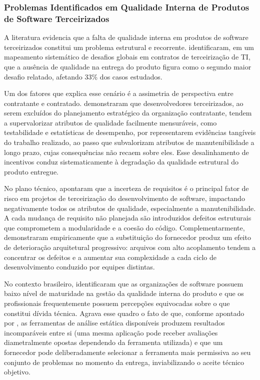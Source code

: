 \subsubsection{Problemas Identificados em Qualidade Interna de Produtos de Software Terceirizados}

A literatura evidencia que a falta de qualidade interna em produtos de software terceirizados constitui um problema estrutural e recorrente.  identificaram, em um mapeamento sistemático de desafios globais em contratos de terceirização de TI, que a ausência de qualidade na entrega do produto figura como o segundo maior desafio relatado, afetando 33\% dos casos estudados.

Um dos fatores que explica esse cenário é a assimetria de perspectiva entre contratante e contratado.  demonstraram que desenvolvedores terceirizados, ao serem excluídos do planejamento estratégico da organização contratante, tendem a supervalorizar atributos de qualidade facilmente mensuráveis, como testabilidade e estatísticas de desempenho, por representarem evidências tangíveis do trabalho realizado, ao passo que subvalorizam atributos de manutenibilidade a longo prazo, cujas consequências não recaem sobre eles. Esse desalinhamento de incentivos conduz sistematicamente à degradação da qualidade estrutural do produto entregue.

No plano técnico,  apontaram que a incerteza de requisitos é o principal fator de risco em projetos de terceirização do desenvolvimento de software, impactando negativamente todos os atributos de qualidade, especialmente a manutenibilidade. A cada mudança de requisito não planejada são introduzidos defeitos estruturais que comprometem a modularidade e a coesão do código. Complementarmente,  demonstraram empiricamente que a substituição do fornecedor produz um efeito de deterioração arquitetural progressivo: arquivos com alto acoplamento tendem a concentrar os defeitos e a aumentar sua complexidade a cada ciclo de desenvolvimento conduzido por equipes distintas.

No contexto brasileiro,  identificaram que as organizações de software possuem baixo nível de maturidade na gestão da qualidade interna do produto e que os profissionais frequentemente possuem percepções equivocadas sobre o que constitui dívida técnica. Agrava esse quadro o fato de que, conforme apontado por , as ferramentas de análise estática disponíveis produzem resultados incomparáveis entre si (uma mesma aplicação pode receber avaliações diametralmente opostas dependendo da ferramenta utilizada) e que um fornecedor pode deliberadamente selecionar a ferramenta mais permissiva ao seu conjunto de problemas no momento da entrega, inviabilizando o aceite técnico objetivo.

